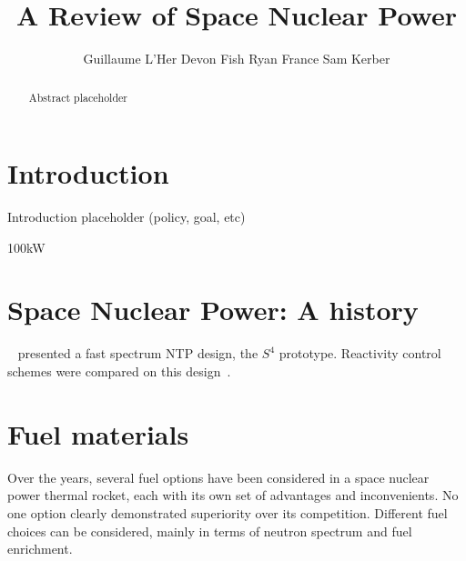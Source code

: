 \documentclass[IJPHM, 2017, 29]{PHMSociety}
\begin{document}
\renewcommand{\kbldelim}{[}%
\renewcommand{\kbrdelim}{]}%

\title{A Review of Space Nuclear Power}

\author{%
	Guillaume L'Her
	Devon Fish
	Ryan France
	Sam Kerber
}

\address{%
}

\maketitle
\pagestyle{fancy}
\thispagestyle{plain}



\begin{abstract}%
Abstract placeholder
\end{abstract}



\section{Introduction}
\label{sec:intro}
Introduction placeholder (policy, goal, etc)

100kW


\section{Space Nuclear Power: A history}
\label{sec:bkgd}

~\cite{king2009thermal} presented a fast spectrum NTP design, the $S^4$ prototype. Reactivity control schemes were compared on this design~\citep{craft2011reactivity}.

\section{Fuel materials}

Over the years, several fuel options have been considered in a space nuclear power thermal rocket, each with its own set of advantages and inconvenients. No one option clearly demonstrated superiority over its competition. Different fuel choices can be considered, mainly in terms of neutron spectrum and fuel enrichment.
\end{document}
